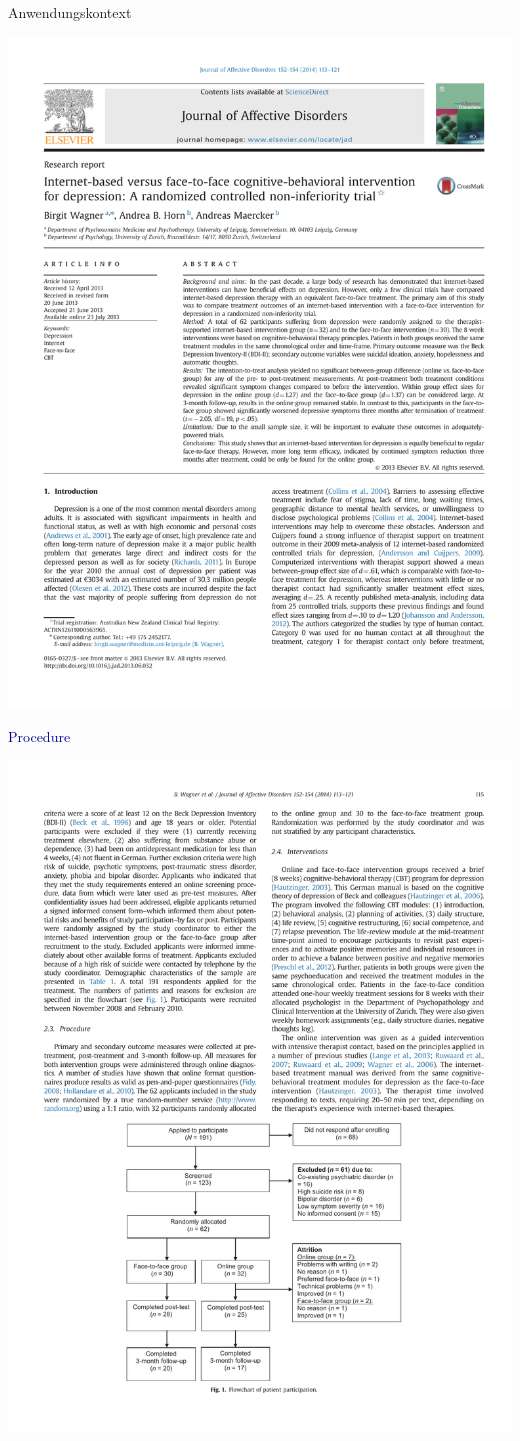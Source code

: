 \documentclass[
  8pt,
  ignorenonframetext,
]{beamer}
\begin{document}
\begin{frame}[t]{Anwendungskontext}
\protect\hypertarget{anwendungskontext-9}{}
\begin{center}\includegraphics[width=0.5\linewidth]{8_Abbildungen/alm_8_article_title} \end{center}
\center

\textcolor{darkblue}{Procedure}

\begin{center}\includegraphics[width=0.5\linewidth]{8_Abbildungen/alm_8_article_procedure_1} \end{center}
\vspace{-3mm}


\end{frame}
\end{document}
